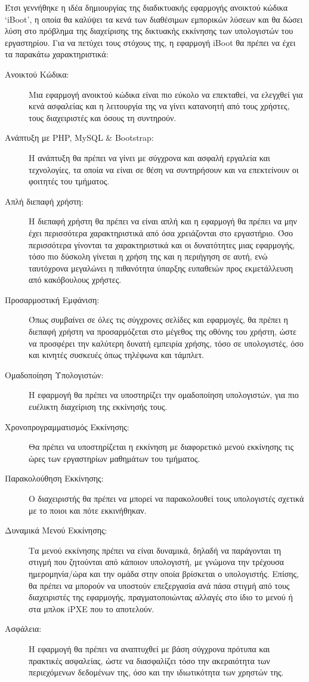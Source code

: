 Έτσι γεννήθηκε η ιδέα δημιουργίας της διαδικτυακής εφαρμογής ανοικτού κώδικα `iBoot', η οποία θα καλύψει τα κενά των διαθέσιμων εμπορικών λύσεων και θα δώσει λύση στο πρόβλημα της διαχείρισης της δικτυακής εκκίνησης των υπολογιστών του εργαστηρίου. Για να πετύχει τους στόχους της, η εφαρμογή iBoot θα πρέπει να έχει τα παρακάτω χαρακτηριστικά:
\begin{description}
	\item [Ανοικτού Κώδικα:] Μια εφαρμογή ανοικτού κώδικα είναι πιο εύκολο να επεκταθεί, να ελεγχθεί για κενά ασφαλείας και η λειτουργία της να γίνει κατανοητή από τους χρήστες, τους διαχειριστές και όσους τη συντηρούν.
	\item [Ανάπτυξη με PHP, MySQL \& Bootstrap:] Η ανάπτυξη θα πρέπει να γίνει με σύγχρονα και ασφαλή εργαλεία και τεχνολογίες, τα οποία να είναι σε θέση να συντηρήσουν και να επεκτείνουν οι φοιτητές του τμήματος.
	\item [Απλή διεπαφή χρήστη:] Η διεπαφή χρήστη θα πρέπει να είναι απλή και η εφαρμογή θα πρέπει να μην έχει περισσότερα χαρακτηριστικά από όσα χρειάζονται στο εργαστήριο. Όσο περισσότερα γίνονται τα χαρακτηριστικά και οι δυνατότητες μιας εφαρμογής, τόσο πιο δύσκολη γίνεται η χρήση της και η περιήγηση σε αυτή, ενώ ταυτόχρονα μεγαλώνει η πιθανότητα ύπαρξης ευπαθειών προς εκμετάλλευση από κακόβουλους χρήστες.
	\item [Προσαρμοστική Εμφάνιση:] Όπως συμβαίνει σε όλες τις σύγχρονες σελίδες και εφαρμογές, θα πρέπει η διεπαφή χρήστη να προσαρμόζεται στο μέγεθος της οθόνης του χρήστη, ώστε να προσφέρει την καλύτερη δυνατή εμπειρία χρήσης, τόσο σε υπολογιστές, όσο και κινητές συσκευές όπως τηλέφωνα και τάμπλετ.
	\item [Ομαδοποίηση Υπολογιστών:] Η εφαρμογή θα πρέπει να υποστηρίζει την ομαδοποίηση υπολογιστών, για πιο ευέλικτη διαχείριση της εκκίνησής τους.
	\item [Χρονοπρογραμματισμός Εκκίνησης:] Θα πρέπει να υποστηρίζεται η εκκίνηση με διαφορετικό μενού εκκίνησης τις ώρες των εργαστηρίων μαθημάτων του τμήματος.
	\item [Παρακολούθηση Εκκίνησης:] Ο διαχειριστής θα πρέπει να μπορεί να παρακολουθεί τους υπολογιστές σχετικά με το ποιοι και πότε εκκινήθηκαν.
	\item [Δυναμικά Μενού Εκκίνησης:] Τα μενού εκκίνησης πρέπει να είναι δυναμικά, δηλαδή να παράγονται τη στιγμή που ζητούνται από κάποιον υπολογιστή, με γνώμονα την τρέχουσα ημερομηνία/ώρα και την ομάδα στην οποία βρίσκεται ο υπολογιστής. Επίσης, θα πρέπει να μπορούν να υποστούν επεξεργασία ανά πάσα στιγμή από τους διαχειριστές της εφαρμογής, πραγματοποιώντας αλλαγές στο ίδιο το μενού ή στα μπλοκ iPXE που το αποτελούν.
	\item [Ασφάλεια:] Η εφαρμογή θα πρέπει να αναπτυχθεί με βάση σύγχρονα πρότυπα και πρακτικές ασφαλείας, ώστε να διασφαλίζει τόσο την ακεραιότητα των περιεχόμενων δεδομένων της, όσο και την ιδιωτικότητα των χρηστών της.
\end{description}

